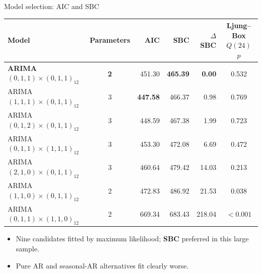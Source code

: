 \documentclass[aspectratio=169,11pt,xcolor=table]{beamer}
\begin{document}
\begin{frame}{Model selection: AIC and SBC}
\centering\small
\begin{tabular}{@{}lcrrrc@{}}
\toprule
Model & Parameters & AIC & SBC & $\Delta$SBC & Ljung--Box $Q(24)$ $p$\\
\midrule
\rowcolor{oiblue!10}\textbf{ARIMA$(0,1,1)\times(0,1,1)_{12}$} & \textbf{2} & 451.30 & \textbf{465.39} & \textbf{0.00} & 0.532\\
ARIMA$(1,1,1)\times(0,1,1)_{12}$ & 3 & \textbf{447.58} & 466.37 & 0.98 & 0.769\\
ARIMA$(0,1,2)\times(0,1,1)_{12}$ & 3 & 448.59 & 467.38 & 1.99 & 0.723\\
ARIMA$(0,1,1)\times(1,1,1)_{12}$ & 3 & 453.30 & 472.08 & 6.69 & 0.472\\
ARIMA$(2,1,0)\times(0,1,1)_{12}$ & 3 & 460.64 & 479.42 & 14.03 & 0.213\\
ARIMA$(1,1,0)\times(0,1,1)_{12}$ & 2 & 472.83 & 486.92 & 21.53 & 0.038\\
ARIMA$(0,1,1)\times(1,1,0)_{12}$ & 2 & 669.34 & 683.43 & 218.04 & $<0.001$\\
\bottomrule
\end{tabular}
\vspace{10pt}
\begin{itemize}
  \item Nine candidates fitted by maximum likelihood; \textbf{SBC} preferred in this large sample.
  \item Pure AR and seasonal-AR alternatives fit clearly worse.
\end{itemize}
\end{frame}
\end{document}
